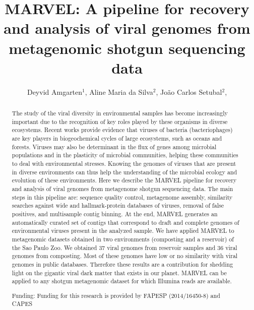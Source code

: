 \documentclass[twoside]{article}
\title{\vspace{-15mm}\fontsize{24pt}{10pt}\selectfont\textbf{ MARVEL: A pipeline for recovery and analysis of viral genomes from metagenomic shotgun sequencing data }} %
\author{ Deyvid Amgarten$^{1}$, Aline Maria da Silva$^{2}$, João Carlos Setubal$^{2}$, }
\affil{ 1 USP - Departamento de Quimica

2 USP

 }
\date{}
\begin{document}
  
  
  \maketitle %
  
  
  \thispagestyle{fancy} %
  
  
  \begin{abstract}
  The study of the viral diversity in environmental samples has become increasingly important due to the recognition of key roles played by these organisms in diverse ecosystems. Recent works provide evidence that viruses of bacteria (bacteriophages) are key players in biogeochemical cycles of large ecosystems, such as oceans and forests. Viruses may also be determinant in the flux of genes among microbial populations and in the plasticity of microbial communities, helping these communities to deal with environmental stresses. Knowing the genomes of viruses that are present in diverse environments can thus help the understanding of the microbial ecology and evolution of these environments. Here we describe the MARVEL pipeline for recovery and analysis of viral genomes from metagenome shotgun sequencing data. The main steps in this pipeline are: sequence quality control, metagenome assembly, similarity searches against wide and hallmark-protein databases of viruses, removal of false positives, and multisample contig binning. At the end, MARVEL generates an automatically curated set of contigs that correspond to draft and complete genomes of environmental viruses present in the analyzed sample. We have applied MARVEL to metagenomic datasets obtained in two environments (composting and a reservoir) of the Sao Paulo Zoo. We obtained 37 viral genomes from reservoir samples and 36 viral genomes from composting. Most of these genomes have low or no similarity with viral genomes in public databases. Therefore these results are a contribution for shedding light on the gigantic viral dark matter that exists in our planet. MARVEL can be applied to any shotgun metagenomic dataset for which Illumina reads are available.
  
  Funding: Funding for this research is provided by FAPESP (2014/16450-8) and CAPES \\ 
  \end{abstract}
  
\end{document}
